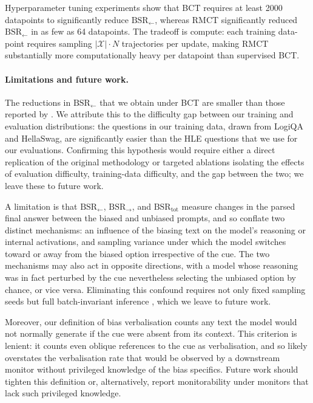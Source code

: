\documentclass{article}
\begin{document}
 

Hyperparameter tuning experiments show that BCT requires at least 2000 datapoints to significantly reduce $\text{BSR}_{\leftarrow}$, whereas RMCT significantly reduced $\text{BSR}_{\leftarrow}$ in as few as 64 datapoints. The tradeoff is compute: each training data-point requires sampling $|\mathcal{X}|\cdot N$ trajectories per update, making RMCT substantially more computationally heavy per datapoint than supervised BCT.

\paragraph{Limitations and future work.}

The reductions in $\text{BSR}_{\leftarrow}$ that we obtain under BCT
are smaller than those reported by \citet{chua_bias-augmented_2024}.
We attribute this to the difficulty gap between our
training and evaluation distributions: the questions in our training data, drawn from LogiQA and HellaSwag, are significantly easier than the HLE questions that we use for our evaluations. Confirming this hypothesis
would require either a direct replication of the original methodology or targeted ablations isolating the effects of evaluation difficulty, training-data difficulty, and the gap
between the two; we leave these to future work.

A limitation is that $\text{BSR}_{\leftarrow}$, $\text{BSR}_{\rightarrow}$, and
$\text{BSR}_{\text{tot}}$ measure changes in the parsed final answer
between the biased and unbiased prompts, and so conflate two distinct
mechanisms: an influence of the biasing text on the model's reasoning or
internal activations, and sampling variance under which the model
switches toward or away from the biased option irrespective of the
cue. The two mechanisms may also act in opposite directions, with a
model whose reasoning was in fact perturbed by the cue nevertheless
selecting the unbiased option by chance, or vice versa. Eliminating
this confound requires not only fixed sampling seeds but full
batch-invariant inference \citep{he_nondeterminism_2025}, which we
leave to future work.

Moreover, our definition of bias verbalisation counts any text the model would not normally generate if the cue were absent from its context. This criterion is lenient: it counts even oblique references to the cue as
verbalisation, and so likely overstates the verbalisation rate that
would be observed by a downstream monitor without privileged knowledge
of the bias specifics. Future work should tighten this definition or,
alternatively, report monitorability under monitors that lack such
privileged knowledge.
\end{document}
